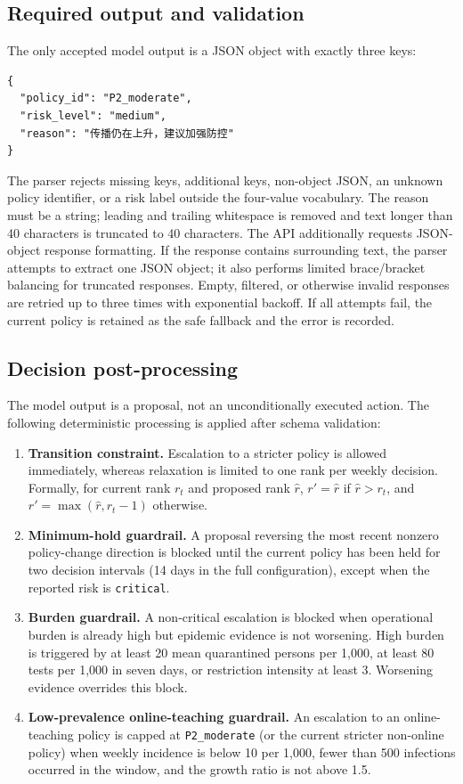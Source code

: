 \subsection{Required output and validation}

The only accepted model output is a JSON object with exactly three keys:

\begin{verbatim}
{
  "policy_id": "P2_moderate",
  "risk_level": "medium",
  "reason": "传播仍在上升，建议加强防控"
}
\end{verbatim}

The parser rejects missing keys, additional keys, non-object JSON, an unknown
policy identifier, or a risk label outside the four-value vocabulary.  The
reason must be a string; leading and trailing whitespace is removed and text
longer than 40 characters is truncated to 40 characters.  The API additionally
requests JSON-object response formatting.  If the response contains surrounding
text, the parser attempts to extract one JSON object; it also performs limited
brace/bracket balancing for truncated responses.  Empty, filtered, or otherwise
invalid responses are retried up to three times with exponential backoff.  If
all attempts fail, the current policy is retained as the safe fallback and the
error is recorded.

\subsection{Decision post-processing}

The model output is a proposal, not an unconditionally executed action.  The
following deterministic processing is applied after schema validation:

\begin{enumerate}
  \item \textbf{Transition constraint.} Escalation to a stricter policy is
  allowed immediately, whereas relaxation is limited to one rank per weekly
  decision.  Formally, for current rank \(r_t\) and proposed rank \(\hat r\),
  \(r'=\hat r\) if \(\hat r>r_t\), and
  \(r'=\max(\hat r,r_t-1)\) otherwise.
  \item \textbf{Minimum-hold guardrail.} A proposal reversing the most recent
  nonzero policy-change direction is blocked until the current policy has been
  held for two decision intervals (14 days in the full configuration), except
  when the reported risk is \texttt{critical}.
  \item \textbf{Burden guardrail.} A non-critical escalation is blocked when
  operational burden is already high but epidemic evidence is not worsening.
  High burden is triggered by at least 20 mean quarantined persons per 1,000,
  at least 80 tests per 1,000 in seven days, or restriction intensity at least
  3. Worsening evidence overrides this block.
  \item \textbf{Low-prevalence online-teaching guardrail.} An escalation to an
  online-teaching policy is capped at \texttt{P2\_moderate} (or the current
  stricter non-online policy) when weekly incidence is below 10 per 1,000, fewer
  than 500 infections occurred in the window, and the growth ratio is not above
  1.5.
\end{enumerate}


